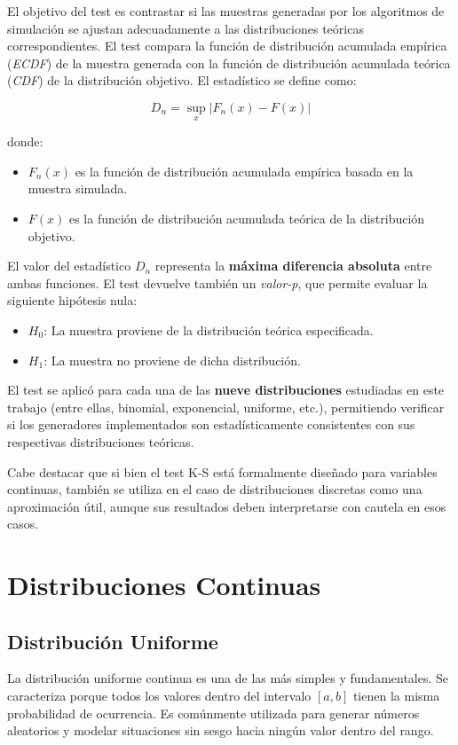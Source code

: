 \documentclass{article}
\begin{document}
El objetivo del test es contrastar si las muestras generadas por los algoritmos de simulación se ajustan adecuadamente a las distribuciones teóricas correspondientes. El test compara la función de distribución acumulada empírica (\emph{ECDF}) de la muestra generada con la función de distribución acumulada teórica (\emph{CDF}) de la distribución objetivo. El estadístico se define como:

\[
D_n = \sup_x \left| F_n(x) - F(x) \right|
\]

donde:
\begin{itemize}
    \item \( F_n(x) \) es la función de distribución acumulada empírica basada en la muestra simulada.
    \item \( F(x) \) es la función de distribución acumulada teórica de la distribución objetivo.
\end{itemize}

El valor del estadístico \( D_n \) representa la \textbf{máxima diferencia absoluta} entre ambas funciones. El test devuelve también un \emph{valor-p}, que permite evaluar la siguiente hipótesis nula:

\begin{itemize}
    \item \( H_0 \): La muestra proviene de la distribución teórica especificada.
    \item \( H_1 \): La muestra no proviene de dicha distribución.
\end{itemize}

El test se aplicó para cada una de las \textbf{nueve distribuciones} estudiadas en este trabajo (entre ellas, binomial, exponencial, uniforme, etc.), permitiendo verificar si los generadores implementados son estadísticamente consistentes con sus respectivas distribuciones teóricas.

Cabe destacar que si bien el test K-S está formalmente diseñado para variables continuas, también se utiliza en el caso de distribuciones discretas como una aproximación útil, aunque sus resultados deben interpretarse con cautela en esos casos.


\section{Distribuciones Continuas}

\subsection{Distribución Uniforme}
La distribución uniforme continua es una de las más simples y fundamentales. Se caracteriza porque todos los valores dentro del intervalo $[a, b]$ tienen la misma probabilidad de ocurrencia. Es comúnmente utilizada para generar números aleatorios y modelar situaciones sin sesgo hacia ningún valor dentro del rango.
\end{document}
